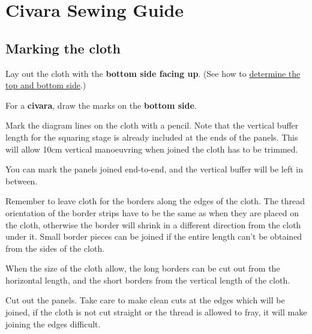 \chapter{Civara Sewing Guide}

\section{Marking the cloth}

Lay out the cloth with the \textbf{bottom side facing up}. (See how to
\href{/en/sabong-guide\#determine-the-top-and-bottom-side}{determine the
top and bottom side}.)

For a \textbf{civara}, draw the marks on the \textbf{bottom side}.

\begin{multicols}{2}
\setlength{\nextPhotoWidth}{\linewidth}


\columnbreak

Mark the diagram lines on the cloth with a pencil. Note that the
vertical buffer length for the squaring stage is already included at the
ends of the panels. This will allow 10cm vertical manoeuvring when
joined the cloth has to be trimmed.

You can mark the panels joined end-to-end, and the vertical buffer will
be left in between.

\end{multicols}

\clearpage



Remember to leave cloth for the borders along the edges of the cloth.
The thread orientation of the border strips have to be the same as when
they are placed on the cloth, otherwise the border will shrink in a
different direction from the cloth under it. Small border pieces can be
joined if the entire length can't be obtained from the sides of the
cloth.

When the size of the cloth allow, the long borders can be cut out from
the horizontal length, and the short borders from the vertical length of
the cloth.

Cut out the panels. Take care to make clean cuts at the edges which will
be joined, if the cloth is not cut straight or the thread is allowed to
fray, it will make joining the edges difficult.

